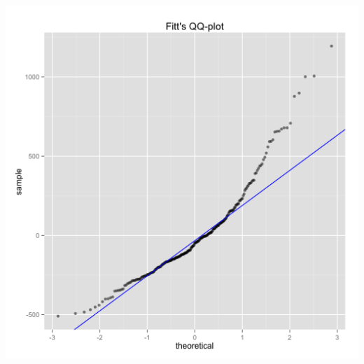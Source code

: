 \begin{minipage}{.5\textwidth}
	\centering
	\includegraphics[width=\textwidth]{images/plots/plot_qq_fitt}
	\label{fig:plot_qq_fitt}
\end{minipage}

